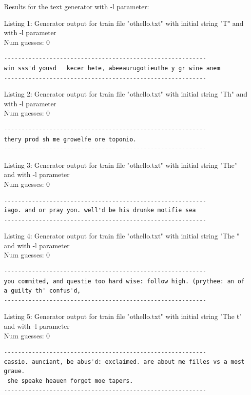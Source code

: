 \documentclass{article}
\begin{document}
Results for the text generator with -l parameter:


\hfill

Listing 1: Generator output for train file "othello.txt" with initial string "T" and with -l parameter
\\Num guesses: 0

\begin{lstlisting}
----------------------------------------------------------
win sss'd yousd   kecer hete, abeeaurugotieuthe y gr wine anem
----------------------------------------------------------
\end{lstlisting}

Listing 2: Generator output for train file "othello.txt" with initial string "Th" and with -l parameter
\\Num guesses: 0

\begin{lstlisting}
----------------------------------------------------------
thery prod sh me growelfe ore toponio.
----------------------------------------------------------
\end{lstlisting}

Listing 3: Generator output for train file "othello.txt" with initial string "The" and with -l parameter
\\Num guesses: 0

\begin{lstlisting}
----------------------------------------------------------
iago. and or pray yon. well'd be his drunke motifie sea
----------------------------------------------------------
\end{lstlisting}

Listing 4: Generator output for train file "othello.txt" with initial string "The " and with -l parameter
\\Num guesses: 0

\begin{lstlisting}
----------------------------------------------------------
you commited, and questie too hard wise: follow high. (prythee: an of a guilty th' confus'd,
----------------------------------------------------------
\end{lstlisting}

Listing 5: Generator output for train file "othello.txt" with initial string "The t" and with -l parameter
\\Num guesses: 0

\begin{lstlisting}
----------------------------------------------------------
cassio. aunciant, be abus'd: exclaimed. are about me filles vs a most graue.
 she speake heauen forget moe tapers.
----------------------------------------------------------
\end{lstlisting}
\end{document}
